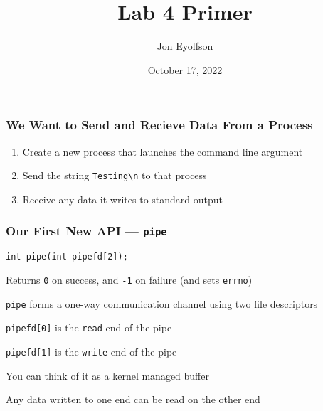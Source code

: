 

\title{Lab 4 Primer}
\author{Jon Eyolfson}
\date{October 17, 2022}


  \begin{frame}
    \titlepage
  \end{frame}

  \begin{frame}
    \frametitle{We Want to Send and Recieve Data From a Process}

    \begin{enumerate}
      \item Create a new process that launches the command line argument
      \item Send the string \texttt{Testing\textbackslash n} to that process
      \item Receive any data it writes to standard output
    \end{enumerate}
  \end{frame}

  \begin{frame}
    \frametitle{Our First New API --- \texttt{pipe}}

    \lstinline!int pipe(int pipefd[2]);!

    \vspace{2em}

    Returns \texttt{0} on success, and \texttt{-1} on failure
    (and sets \texttt{errno})

    \vspace{2em}

    \texttt{pipe} forms a one-way communication channel using two file
    descriptors

    \hspace{2em} \texttt{pipefd[0]} is the \texttt{read} end of the pipe

    \hspace{2em} \texttt{pipefd[1]} is the \texttt{write} end of the pipe

    \vspace{2em}

    You can think of it as a kernel managed buffer
    
    \hspace{2em} Any data written to one end can be read on the other end
  \end{frame}

